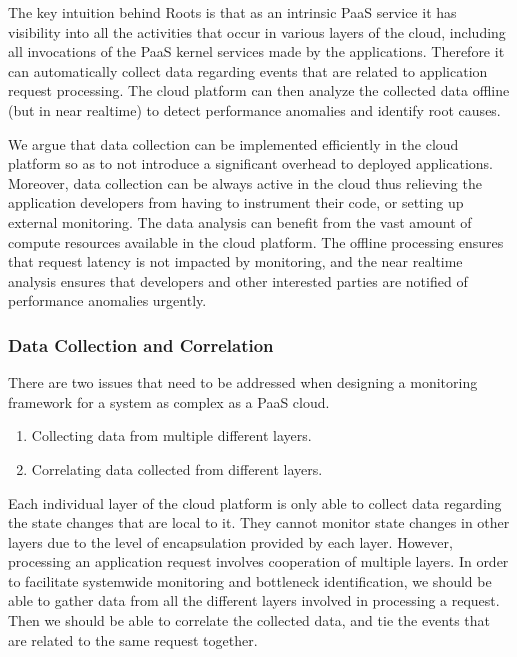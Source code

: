 The key intuition behind Roots is that as an intrinsic PaaS service
it has visibility into all the activities that occur in various layers of the cloud,
including all invocations of the PaaS kernel services made by the applications.
Therefore it can automatically collect
 data regarding events that are related to application request processing. 
The cloud platform can then analyze the collected data offline (but in near realtime) to detect 
performance anomalies and identify root causes.

We argue that data collection can be implemented efficiently in the cloud platform so as to not
introduce a significant overhead to deployed applications.
Moreover, data collection can be always active in the cloud thus relieving the application developers
from having to instrument their code, or setting up external monitoring.
The data analysis can benefit from the vast amount of compute
resources available in the cloud platform. The offline processing ensures that request
latency is not impacted by monitoring, and the near realtime analysis ensures that developers
and other interested parties are notified of performance anomalies urgently. 

\subsubsection{Data Collection and Correlation}

There are two issues that need to be addressed when designing a monitoring framework for
a system as complex as a PaaS cloud.
\begin{enumerate}
\item Collecting data from multiple different layers.
\item Correlating data collected from different layers.
\end{enumerate}

Each individual layer of the cloud platform is only able to collect data regarding the
state changes that are local to it. They cannot monitor state changes
in other layers due to the level of encapsulation provided by each layer. However,
processing an application request involves cooperation of multiple 
layers. 
In order to facilitate systemwide monitoring and
bottleneck identification, we should be able to gather data from all the different layers involved
in processing a request. Then we should be able to correlate the collected data, and tie the events that
are related to the same request together.

